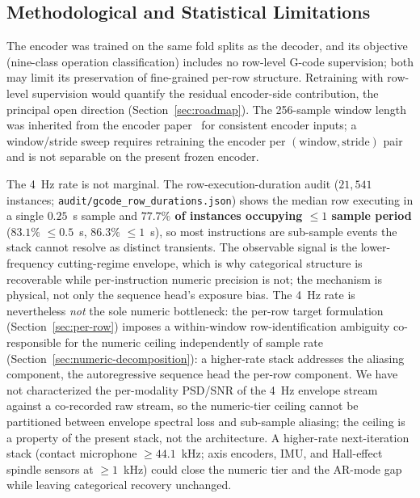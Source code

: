 \documentclass[sensors,article,submit,moreauthors,pdftex]{Definitions/mdpi}
\begin{document}
\subsection{Methodological and Statistical Limitations}
\label{sec:lim-method}

The encoder was trained on the same fold splits as the decoder, and its objective (nine-class operation classification) includes no row-level G-code supervision; both may limit its preservation of fine-grained per-row structure. Retraining with row-level supervision would quantify the residual encoder-side contribution, the principal open direction (Section~\ref{sec:roadmap}). The 256-sample window length was inherited from the encoder paper~\cite{encoder_paper} for consistent encoder inputs; a window/stride sweep requires retraining the encoder per $(\text{window}, \text{stride})$ pair and is not separable on the present frozen encoder.

The 4~Hz rate is not marginal. The row-execution-duration audit ($21{,}541$ instances; \texttt{audit/gcode\_row\_durations.json}) shows the median row executing in a single $0.25$~s sample and \textbf{$77.7\%$ of instances occupying $\le\!1$ sample period} ($83.1\%$ $\le\!0.5$~s, $86.3\%$ $\le\!1$~s), so most instructions are sub-sample events the stack cannot resolve as distinct transients. The observable signal is the lower-frequency cutting-regime envelope, which is why categorical structure is recoverable while per-instruction numeric precision is not; the mechanism is physical, not only the sequence head's exposure bias. The 4~Hz rate is nevertheless \emph{not} the sole numeric bottleneck: the per-row target formulation (Section~\ref{sec:per-row}) imposes a within-window row-identification ambiguity co-responsible for the numeric ceiling independently of sample rate (Section~\ref{sec:numeric-decomposition}): a higher-rate stack addresses the aliasing component, the autoregressive sequence head the per-row component. We have not characterized the per-modality PSD/SNR of the 4~Hz envelope stream against a co-recorded raw stream, so the numeric-tier ceiling cannot be partitioned between envelope spectral loss and sub-sample aliasing; the ceiling is a property of the present stack, not the architecture. A higher-rate next-iteration stack (contact microphone $\geq 44.1$~kHz; axis encoders, IMU, and Hall-effect spindle sensors at $\geq 1$~kHz) could close the numeric tier and the AR-mode gap while leaving categorical recovery unchanged.
\end{document}
